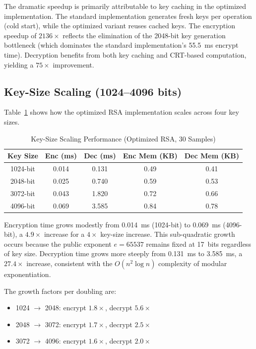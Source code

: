 \documentclass[journal]{IEEEtran}
\begin{document}
The dramatic speedup is primarily attributable to key caching in the optimized implementation. The standard implementation generates fresh keys per operation (cold start), while the optimized variant reuses cached keys. The encryption speedup of $2136\times$ reflects the elimination of the 2048-bit key generation bottleneck (which dominates the standard implementation's 55.5~ms encrypt time). Decryption benefits from both key caching and CRT-based computation, yielding a $75\times$ improvement.

\subsection{Key-Size Scaling (1024--4096 bits)}

Table~\ref{tab:keysize} shows how the optimized RSA implementation scales across four key sizes.

\begin{table}[!t]
\caption{Key-Size Scaling Performance (Optimized RSA, 30 Samples)}
\label{tab:keysize}
\centering
\begin{tabular}{|c|c|c|c|c|}
\hline
\textbf{Key Size} & \textbf{Enc (ms)} & \textbf{Dec (ms)} & \textbf{Enc Mem (KB)} & \textbf{Dec Mem (KB)} \\
\hline
1024-bit & 0.014 & 0.131 & 0.49 & 0.41 \\
\hline
2048-bit & 0.025 & 0.740 & 0.59 & 0.53 \\
\hline
3072-bit & 0.043 & 1.820 & 0.72 & 0.66 \\
\hline
4096-bit & 0.069 & 3.585 & 0.84 & 0.78 \\
\hline
\end{tabular}
\end{table}

Encryption time grows modestly from 0.014~ms (1024-bit) to 0.069~ms (4096-bit), a $4.9\times$ increase for a $4\times$ key-size increase. This sub-quadratic growth occurs because the public exponent $e = 65537$ remains fixed at 17~bits regardless of key size. Decryption time grows more steeply from 0.131~ms to 3.585~ms, a $27.4\times$ increase, consistent with the $O(n^2 \log n)$ complexity of modular exponentiation.

The growth factors per doubling are:
\begin{itemize}
    \item 1024 $\rightarrow$ 2048: encrypt $1.8\times$, decrypt $5.6\times$
    \item 2048 $\rightarrow$ 3072: encrypt $1.7\times$, decrypt $2.5\times$
    \item 3072 $\rightarrow$ 4096: encrypt $1.6\times$, decrypt $2.0\times$
\end{itemize}
\end{document}
